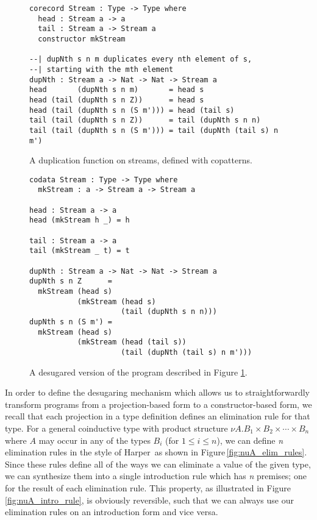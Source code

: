 \begin{figure}
\begin{lstlisting}
corecord Stream : Type -> Type where
  head : Stream a -> a
  tail : Stream a -> Stream a
  constructor mkStream

--| dupNth s n m duplicates every nth element of s, 
--| starting with the mth element
dupNth : Stream a -> Nat -> Nat -> Stream a
head       (dupNth s n m)       = head s
head (tail (dupNth s n Z))      = head s
head (tail (dupNth s n (S m'))) = head (tail s)
tail (tail (dupNth s n Z))      = tail (dupNth s n n)
tail (tail (dupNth s n (S m'))) = tail (dupNth (tail s) n m')
\end{lstlisting}
\caption{A duplication function on streams, defined with copatterns.}
\label{fig:dup_copatterns}
\end{figure}

\begin{figure}
\begin{lstlisting}
codata Stream : Type -> Type where
  mkStream : a -> Stream a -> Stream a

head : Stream a -> a
head (mkStream h _) = h

tail : Stream a -> a
tail (mkStream _ t) = t

dupNth : Stream a -> Nat -> Nat -> Stream a
dupNth s n Z      =
  mkStream (head s)
           (mkStream (head s)
                     (tail (dupNth s n n)))
dupNth s n (S m') =
  mkStream (head s)
           (mkStream (head (tail s))
                     (tail (dupNth (tail s) n m')))
\end{lstlisting}
\caption{A desugared version of the program described in Figure \ref{fig:dup_copatterns}.}
\label{fig:dup_desugared}
\end{figure}

In order to define the desugaring mechanism which allows us to straightforwardly transform programs from a projection-based form to a constructor-based form, we recall that each projection in a type definition defines an elimination rule for that type. For a general coinductive type with product structure $\nu A. B_1 \times B_2 \times \cdots \times B_n$ where $A$ may occur in any of the types $B_i$ (for $1 \leq i \leq n$), we can define \textit{n} elimination rules in the style of Harper\,\cite[Ch. 15]{Harper:2012} as shown in Figure\,\ref{fig:nuA_elim_rules}. Since these rules define all of the ways we can eliminate a value of the given type, we can synthesize them into a single introduction rule which has \textit{n} premises; one for the result of each elimination rule. This property, as illustrated in Figure\,\ref{fig:nuA_intro_rule}, is obviously reversible, such that we can always use our elimination rules on an introduction form and vice versa.

